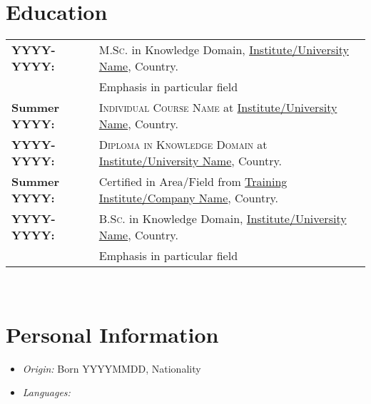 \documentclass[11pt, a4paper]{article}
\begin{document}
\section*{Education}
\noindent
\begin{tabular}{ll}
\textbf{YYYY-YYYY:}&\textsc{M.Sc.} in Knowledge Domain, {\href{http://website.institute.com}{Institute/University Name}}, Country.\\&Emphasis in particular field\\
\textbf{Summer YYYY:}&\textsc{Individual Course Name} at {\href{http://website.institute.com}{Institute/University Name}}, Country.\\
\textbf{YYYY-YYYY:}&\textsc{Diploma in Knowledge Domain} at {\href{http://website.institute.com}{Institute/University Name}}, Country.\\
\textbf{Summer YYYY:}&Certified in Area/Field from \href{http://website.institute.com/}{Training Institute/Company Name}, Country.\\
\textbf{YYYY-YYYY:}&\textsc{B.Sc.} in Knowledge Domain, {\href{http://website.institute.com}{Institute/University Name}}, Country.\\&Emphasis in particular field\\
\end{tabular}\\






\dotfill
\section*{Personal Information}
\begin{itemize}\addtolength{\itemsep}{-0.5\baselineskip}
\item \textit{Origin:} Born YYYYMMDD, Nationality
\item \textit{Languages:}
\end{itemize}
\end{document}
